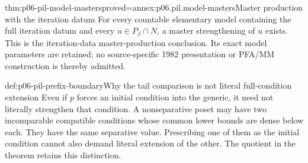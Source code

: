 \begin{hbcorollary}{thm:p06-pil-model-masters}{proved=annex:p06.pil.model-masters}{Master production with the iteration datum}
For every countable elementary model containing the full iteration
datum and every \(u\in P_\beta\cap N\), a master strengthening of
\(u\) exists. This is the iteration-data master-production conclusion.
Its exact model parameters are retained; no source-specific 1982
presentation or PFA/MM construction is thereby admitted.
\end{hbcorollary}

\begin{hbexample}{def:p06-pil-prefix-boundary}{Why the tail comparison is not literal full-condition extension}
Even if \(p\) forces an initial condition into the generic, it need
not literally strengthen that condition. A nonseparative poset may
have two incomparable compatible conditions whose common lower bounds
are dense below each. They have the same separative value. Prescribing
one of them as the initial condition cannot also demand literal extension
of the other. The quotient in the theorem retains this distinction.
\end{hbexample}

